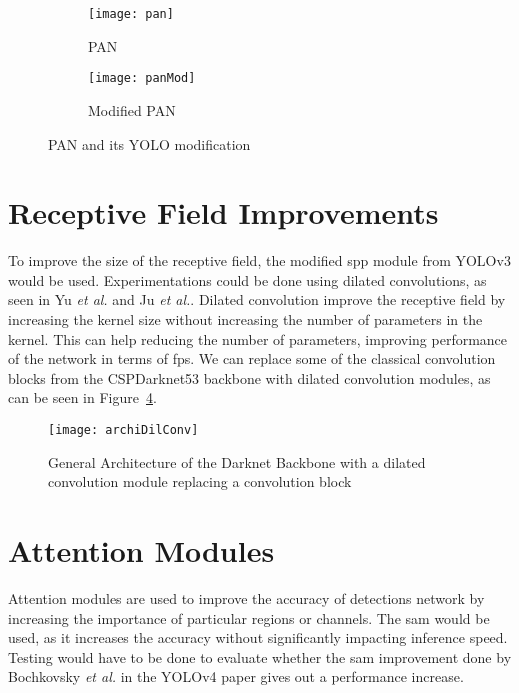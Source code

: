 \begin{figure}[H]
	\centering
	\begin{subfigure}[b]{0.3\textwidth}
		\centering
		\texttt{[image: pan]}
		\caption{PAN}
		\label{fig:pan}
	\end{subfigure}
	\begin{subfigure}[b]{0.3\textwidth}
		\centering
		\texttt{[image: panMod]}
		\caption{Modified PAN}
		\label{fig:panmod}
	\end{subfigure}
	\caption{PAN and its YOLO modification}
	\label{fig:PAN}
\end{figure}

\section{Receptive Field Improvements}

To improve the size of the receptive field, the modified \gls{spp} module from YOLOv3\cite{yolov3} would be used. Experimentations could be done using dilated convolutions, as seen in Yu \textit{et al.}\cite{yu2015} and Ju \textit{et al.}. Dilated convolution improve the receptive field by increasing the kernel size without increasing the number of parameters in the kernel. This can help reducing the number of parameters, improving performance of the network in terms of \gls{fps}. We can replace some of the classical convolution blocks from the CSPDarknet53 backbone with dilated convolution modules, as can be seen in Figure~\ref{fig:dilConvDarknet}. 

\begin{figure}[H]
	\centering
	\texttt{[image: archiDilConv]}
	\caption[]{General Architecture of the Darknet Backbone with a dilated convolution module replacing a convolution block}
	\label{fig:dilConvDarknet}
\end{figure}

\section{Attention Modules}
Attention modules are used to improve the accuracy of detections network by increasing the importance of particular regions or channels. The \gls{sam}\cite{sam} would be used, as it increases the accuracy without significantly impacting inference speed. Testing would have to be done to evaluate whether the \gls{sam} improvement done by Bochkovsky \textit{et al.} in the YOLOv4 paper\cite{yolov4} gives out a performance increase.

